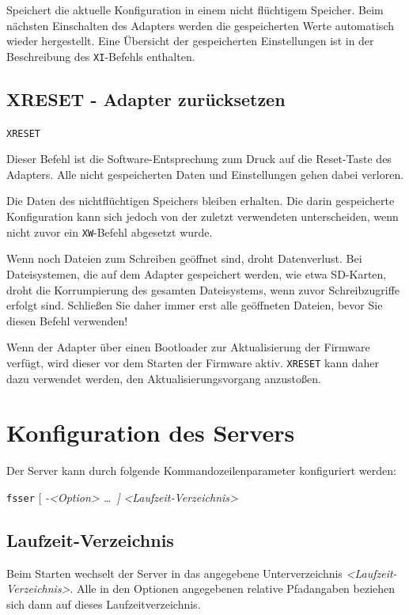 \documentclass[10pt,a4paper]{scrartcl}		%
\begin{document}
Speichert die aktuelle Konfiguration in einem nicht flüchtigem Speicher.
Beim nächsten Einschalten des Adapters werden die gespeicherten Werte
automatisch wieder hergestellt. Eine Übersicht der gespeicherten
Einstellungen ist in der Be\-schrei\-bung des \texttt{XI}-Befehls enthalten.

\subsection{XRESET - Adapter zurücksetzen}

\texttt{XRESET}

Dieser Befehl ist die Software-Entsprechung zum Druck auf die Reset-Taste
des Adapters. Alle nicht gespeicherten Daten und Einstellungen gehen dabei
verloren.

Die Daten des nichtflüchtigen Speichers bleiben erhalten. Die darin
gespeicherte Konfiguration kann sich jedoch von der zuletzt verwendeten
unterscheiden, wenn nicht zuvor ein \texttt{XW}-Befehl abgesetzt
wurde. 

Wenn noch Dateien zum Schreiben geöffnet sind, droht Datenverlust. 
Bei Dateisystemen, die auf dem Adapter gespeichert werden, wie etwa SD-Karten,
droht die Korrumpierung des gesamten Dateisystems, wenn zuvor
Schreibzugriffe erfolgt sind. Schließen Sie daher immer erst alle
geöffneten Dateien, bevor Sie diesen Befehl verwenden!

Wenn der Adapter über einen Bootloader zur Aktualisierung der Firmware
verfügt, wird dieser vor dem Starten der Firmware aktiv. \texttt{XRESET}
kann daher dazu verwendet werden, den Aktualisierungsvorgang anzustoßen.

\clearpage
\section{Konfiguration des Servers}
\label{serverconf}
Der Server kann durch folgende Kommandozeilenparameter konfiguriert 
werden:

\texttt{fsser} \Big[ \textit{-<Option> \ldots \ \Big] }
\textit{<Laufzeit-Verzeichnis>}

\subsection{Laufzeit-Verzeichnis}
Beim Starten wechselt der Server in das angegebene Unterverzeichnis
\textit{<Laufzeit-Verzeichnis>}. Alle in den Optionen angegebenen
relative Pfadangaben beziehen sich dann auf dieses Laufzeitverzeichnis.
\end{document}
